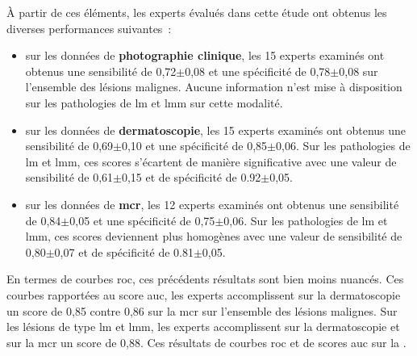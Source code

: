 À partir de ces éléments, les experts évalués dans cette étude ont obtenus les diverses performances suivantes~:
\begin{itemize}
    \item sur les données de \textbf{photographie clinique}, les 15 experts examinés ont obtenus une sensibilité de 0,72$\pm$0,08 et une spécificité de 0,78$\pm$0,08 sur l'ensemble des lésions malignes. Aucune information n'est mise à disposition sur les pathologies de \gls{lm} et \gls{lmm} sur cette modalité.
    \item sur les données de \textbf{dermatoscopie}, les 15 experts examinés ont obtenus une sensibilité de 0,69$\pm$0,10 et une spécificité de 0,85$\pm$0,06. Sur les pathologies de \gls{lm} et \gls{lmm}, ces scores s'écartent de manière significative avec une valeur de sensibilité de 0,61$\pm$0,15 et de spécificité de 0.92$\pm$0,05.
    \item sur les données de \textbf{\gls{mcr}}, les 12 experts examinés ont obtenus une sensibilité de 0,84$\pm$0,05 et une spécificité de 0,75$\pm$0,06. Sur les pathologies de \gls{lm} et \gls{lmm}, ces scores deviennent plus homogènes avec une valeur de sensibilité de 0,80$\pm$0,07 et de spécificité de 0.81$\pm$0,05.
\end{itemize}\par

En termes de courbes \gls{roc}, ces précédents résultats sont bien moins nuancés. Ces courbes rapportées au score \gls{auc}, les experts accomplissent sur la dermatoscopie un score de 0,85 contre 0,86 sur la \gls{mcr} sur l'ensemble des lésions malignes. Sur les lésions de type \gls{lm} et \gls{lmm}, les experts accomplissent sur la dermatoscopie et sur la \gls{mcr} un score de 0,88. Ces résultats de courbes \gls{roc} et de scores \gls{auc} sur la .\par

